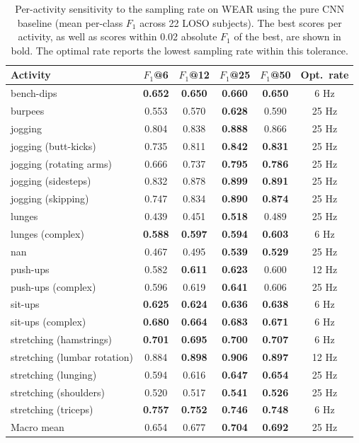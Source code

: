 \begin{table}[t]
  \centering
  \small
  \caption{Per-activity sensitivity to the sampling rate on WEAR using the pure CNN baseline (mean per-class $F_1$ across 22 LOSO subjects). The best scores per activity, as well as scores within 0.02 absolute $F_1$ of the best, are shown in bold. The optimal rate reports the lowest sampling rate within this tolerance.}
  \label{tab:standard_cnn_nolstm_perclass_wear}
  \begin{tabularx}{\linewidth}{lccccc}
    \toprule
    Activity & $F_1$@6 & $F_1$@12 & $F_1$@25 & $F_1$@50 & Opt.\ rate \\
    \midrule
    bench-dips & \textbf{0.652} & \textbf{0.650} & \textbf{0.660} & \textbf{0.650} & 6 Hz \\
    burpees & 0.553 & 0.570 & \textbf{0.628} & 0.590 & 25 Hz \\
    jogging & 0.804 & 0.838 & \textbf{0.888} & 0.866 & 25 Hz \\
    jogging (butt-kicks) & 0.735 & 0.811 & \textbf{0.842} & \textbf{0.831} & 25 Hz \\
    jogging (rotating arms) & 0.666 & 0.737 & \textbf{0.795} & \textbf{0.786} & 25 Hz \\
    jogging (sidesteps) & 0.832 & 0.878 & \textbf{0.899} & \textbf{0.891} & 25 Hz \\
    jogging (skipping) & 0.747 & 0.834 & \textbf{0.890} & \textbf{0.874} & 25 Hz \\
    lunges & 0.439 & 0.451 & \textbf{0.518} & 0.489 & 25 Hz \\
    lunges (complex) & \textbf{0.588} & \textbf{0.597} & \textbf{0.594} & \textbf{0.603} & 6 Hz \\
    nan & 0.467 & 0.495 & \textbf{0.539} & \textbf{0.529} & 25 Hz \\
    push-ups & 0.582 & \textbf{0.611} & \textbf{0.623} & 0.600 & 12 Hz \\
    push-ups (complex) & 0.596 & 0.619 & \textbf{0.641} & 0.606 & 25 Hz \\
    sit-ups & \textbf{0.625} & \textbf{0.624} & \textbf{0.636} & \textbf{0.638} & 6 Hz \\
    sit-ups (complex) & \textbf{0.680} & \textbf{0.664} & \textbf{0.683} & \textbf{0.671} & 6 Hz \\
    stretching (hamstrings) & \textbf{0.701} & \textbf{0.695} & \textbf{0.700} & \textbf{0.707} & 6 Hz \\
    stretching (lumbar rotation) & 0.884 & \textbf{0.898} & \textbf{0.906} & \textbf{0.897} & 12 Hz \\
    stretching (lunging) & 0.594 & 0.616 & \textbf{0.647} & \textbf{0.654} & 25 Hz \\
    stretching (shoulders) & 0.520 & 0.517 & \textbf{0.541} & \textbf{0.526} & 25 Hz \\
    stretching (triceps) & \textbf{0.757} & \textbf{0.752} & \textbf{0.746} & \textbf{0.748} & 6 Hz \\
    \midrule
    Macro mean & 0.654 & 0.677 & \textbf{0.704} & \textbf{0.692} & 25 Hz \\
    \bottomrule
  \end{tabularx}
\end{table}
